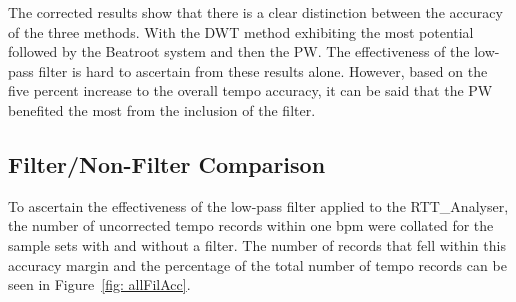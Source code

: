 \documentclass[a4paper, 11pt]{article}
\begin{document}
The corrected results show that there is a clear distinction between the accuracy of the three methods. With the DWT method exhibiting the most potential followed by the Beatroot system and then the PW. The effectiveness of the low-pass filter is hard to ascertain from these results alone. However, based on the five percent increase to the overall tempo accuracy, it can be said that the PW benefited the most from the inclusion of the filter.

\subsection{Filter/Non-Filter Comparison}
To ascertain the effectiveness of the low-pass filter applied to the RTT\_Analyser, the number of uncorrected tempo records within one bpm were collated for the sample sets with and without a filter. The number of records that fell within this accuracy margin and the percentage of the total number of tempo records can be seen in Figure~\ref{fig: allFilAcc}. 
\clearpage
\end{document}
